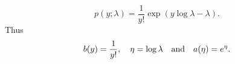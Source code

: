 \begin{answer}
	\[
	    p(y;\lambda)
		=
		\frac{1}{y!}\exp(y\log\lambda-\lambda)
	.\] 
	Thus
	\[
	    b(y)=\frac{1}{y!}
		\qcomma
		\eta=\log\lambda
		\qand
		a(\eta)=e^\eta
	.\] 
\end{answer}
